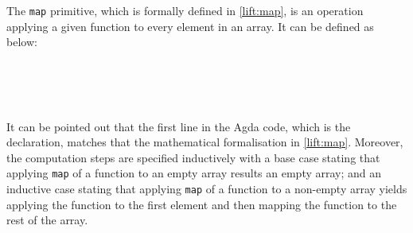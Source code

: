 \documentclass{l4proj}
\begin{document}
The \texttt{map} primitive, which is formally defined in \ref{lift:map}, is an operation applying a given function to every element in an array. It can be defined as below:
\begin{code}%
\>[0]\<%
\\
\>[0]\AgdaSpace{}%
\AgdaSymbol{:}\AgdaSpace{}%
\AgdaSymbol{\{}\AgdaSpace{}%
\AgdaSymbol{:}\AgdaSpace{}%
\AgdaSymbol{\}}\AgdaSpace{}%
\AgdaSpace{}%
\AgdaSymbol{\{}\AgdaSpace{}%
\AgdaSpace{}%
\AgdaSymbol{:}\AgdaSpace{}%
\AgdaSymbol{\}}\AgdaSpace{}%
\AgdaSpace{}%
\AgdaSymbol{(}\AgdaSpace{}%
\AgdaSpace{}%
\AgdaSymbol{)}\AgdaSpace{}%
\AgdaSpace{}%
\AgdaSpace{}%
\AgdaSpace{}%
\AgdaSpace{}%
\AgdaSpace{}%
\AgdaSpace{}%
\AgdaSpace{}%
\<%
\\
\>[0]\AgdaSpace{}%
\AgdaSpace{}%
\AgdaInductiveConstructor{[]}\AgdaSpace{}%
\AgdaSymbol{=}\AgdaSpace{}%
\AgdaInductiveConstructor{[]}\<%
\\
\>[0]\AgdaSpace{}%
\AgdaSpace{}%
\AgdaSymbol{(}\AgdaSpace{}%
\AgdaSpace{}%
\AgdaSymbol{)}\AgdaSpace{}%
\AgdaSymbol{=}\AgdaSpace{}%
\AgdaSpace{}%
\AgdaSpace{}%
\AgdaSpace{}%
\AgdaSpace{}%
\AgdaSpace{}%
\<%
\end{code}
It can be pointed out that the first line in the Agda code, which is the declaration, matches that the mathematical formalisation in \ref{lift:map}. Moreover, the computation steps are specified inductively with a base case stating that applying \texttt{map} of a function to an empty array results an empty array; and an inductive case stating that applying \texttt{map} of a function to a non-empty array yields applying the function to the first element and then mapping the function to the rest of the array.
\end{document}
